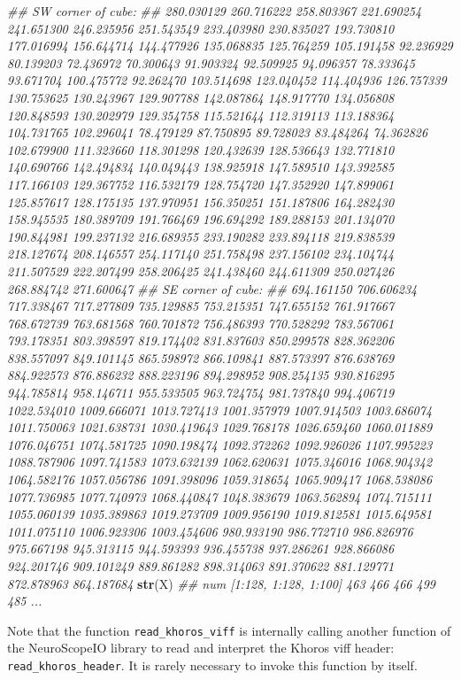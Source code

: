 \documentclass[]{article}
\newenvironment{Shaded}{\begin{snugshade}}{\end{snugshade}}
\newcommand{\CommentTok}[1]{\textcolor[rgb]{0.56,0.35,0.01}{\textit{#1}}}
\newcommand{\KeywordTok}[1]{\textcolor[rgb]{0.13,0.29,0.53}{\textbf{#1}}}
\newcommand{\NormalTok}[1]{#1}
\begin{document}
\begin{Shaded}
\begin{Highlighting}[]
\CommentTok{## SW corner of cube:}
\CommentTok{## 280.030129 260.716222 258.803367 221.690254 241.651300 246.235956 251.543549 233.403980 230.835027 193.730810 177.016994 156.644714 144.477926 135.068835 125.764259 105.191458 92.236929 80.139203 72.436972 70.300643 91.903324 92.509925 94.096357 78.333645 93.671704 100.475772 92.262470 103.514698 123.040452 114.404936 126.757339 130.753625 130.243967 129.907788 142.087864 148.917770 134.056808 120.848593 130.202979 129.354758 115.521644 112.319113 113.188364 104.731765 102.296041 78.479129 87.750895 89.728023 83.484264 74.362826 102.679900 111.323660 118.301298 120.432639 128.536643 132.771810 140.690766 142.494834 140.049443 138.925918 147.589510 143.392585 117.166103 129.367752 116.532179 128.754720 147.352920 147.899061 125.857617 128.175135 137.970951 156.350251 151.187806 164.282430 158.945535 180.389709 191.766469 196.694292 189.288153 201.134070 190.844981 199.237132 216.689355 233.190282 233.894118 219.838539 218.127674 208.146557 254.117140 251.758498 237.156102 234.104744 211.507529 222.207499 258.206425 241.438460 244.611309 250.027426 268.884742 271.600647}
\CommentTok{## SE corner of cube:}
\CommentTok{## 694.161150 706.606234 717.338467 717.277809 735.129885 753.215351 747.655152 761.917667 768.672739 763.681568 760.701872 756.486393 770.528292 783.567061 793.178351 803.398597 819.174402 831.837603 850.299578 828.362206 838.557097 849.101145 865.598972 866.109841 887.573397 876.638769 884.922573 876.886232 888.223196 894.298952 908.254135 930.816295 944.785814 958.146711 955.533505 963.724754 981.737840 994.406719 1022.534010 1009.666071 1013.727413 1001.357979 1007.914503 1003.686074 1011.750063 1021.638731 1030.419643 1029.768178 1026.659460 1060.011889 1076.046751 1074.581725 1090.198474 1092.372262 1092.926026 1107.995223 1088.787906 1097.741583 1073.632139 1062.620631 1075.346016 1068.904342 1064.582176 1057.056786 1091.398096 1059.318654 1065.909417 1068.538086 1077.736985 1077.740973 1068.440847 1048.383679 1063.562894 1074.715111 1055.060139 1035.389863 1019.273709 1009.956190 1019.812581 1015.649581 1011.075110 1006.923306 1003.454606 980.933190 986.772710 986.826976 975.667198 945.313115 944.593393 936.455738 937.286261 928.866086 924.201746 909.101249 889.861282 898.314063 891.370622 881.129771 872.878963 864.187684}
\KeywordTok{str}\NormalTok{(X)}
\CommentTok{##  num [1:128, 1:128, 1:100] 463 466 466 499 485 ...}
\end{Highlighting}
\end{Shaded}

Note that the function \texttt{read\_khoros\_viff} is internally calling another function of the NeuroScopeIO library to read and interpret the Khoros viff header: \texttt{read\_khoros\_header}. It is rarely necessary to invoke this function by itself.
\end{document}
